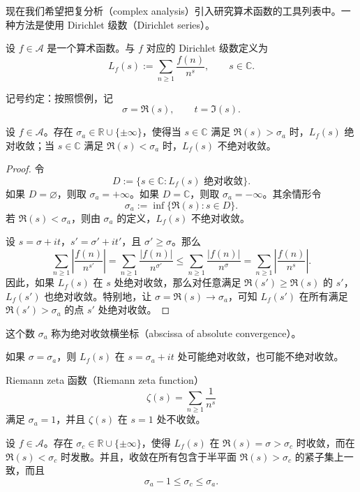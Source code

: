 现在我们希望把复分析（complex analysis）引入研究算术函数的工具列表中。一种方法是使用 Dirichlet 级数（Dirichlet series）。

\begin{definition}
	设 $f\in\mathcal A$ 是一个算术函数。与 $f$ 对应的 Dirichlet 级数定义为
	\[
		L_f(s):=\sum_{n\geq 1}\frac{f(n)}{n^s},
		\qquad s\in\mathbb C.
	\]
\end{definition}

记号约定：按照惯例，记
\[
	\sigma=\Re(s),\qquad t=\Im(s).
\]

\begin{theorem}[原文 Theorem 4.1]
	设 $f\in\mathcal A$。存在 $\sigma_a\in\mathbb R\cup\{\pm\infty\}$，使得当 $s\in\mathbb C$ 满足 $\Re(s)>\sigma_a$ 时，$L_f(s)$ 绝对收敛；当 $s\in\mathbb C$ 满足 $\Re(s)<\sigma_a$ 时，$L_f(s)$ 不绝对收敛。
\end{theorem}

\begin{proof}
	令
	\[
		D:=\{s\in\mathbb C:L_f(s)\text{ 绝对收敛}\}.
	\]
	如果 $D=\varnothing$，则取 $\sigma_a=+\infty$。如果 $D=\mathbb C$，则取 $\sigma_a=-\infty$。其余情形令
	\[
		\sigma_a:=\inf\{\Re(s):s\in D\}.
	\]
	若 $\Re(s)<\sigma_a$，则由 $\sigma_a$ 的定义，$L_f(s)$ 不绝对收敛。

	设 $s=\sigma+it$，$s'=\sigma'+it'$，且 $\sigma'\geq\sigma$。那么
	\[
		\sum_{n\geq 1}\left|\frac{f(n)}{n^{s'}}\right|
		=
		\sum_{n\geq 1}\frac{|f(n)|}{n^{\sigma'}}
		\leq
		\sum_{n\geq 1}\frac{|f(n)|}{n^\sigma}
		=
		\sum_{n\geq 1}\left|\frac{f(n)}{n^s}\right|.
	\]
	因此，如果 $L_f(s)$ 在 $s$ 处绝对收敛，那么对任意满足 $\Re(s')\geq\Re(s)$ 的 $s'$，$L_f(s')$ 也绝对收敛。特别地，让 $\sigma=\Re(s)\to\sigma_a$，可知 $L_f(s')$ 在所有满足 $\Re(s')>\sigma_a$ 的点 $s'$ 处绝对收敛。
\end{proof}

这个数 $\sigma_a$ 称为绝对收敛横坐标（abscissa of absolute convergence）。

\begin{remark}
	如果 $\sigma=\sigma_a$，则 $L_f(s)$ 在 $s=\sigma_a+it$ 处可能绝对收敛，也可能不绝对收敛。
\end{remark}

\begin{example}
	Riemann zeta 函数（Riemann zeta function）
	\[
		\zeta(s)=\sum_{n\geq 1}\frac1{n^s}
	\]
	满足 $\sigma_a=1$，并且 $\zeta(s)$ 在 $s=1$ 处不收敛。
\end{example}

\begin{theorem}[原文 Theorem 4.2]
	设 $f\in\mathcal A$。存在 $\sigma_c\in\mathbb R\cup\{\pm\infty\}$，使得 $L_f(s)$ 在 $\Re(s)=\sigma>\sigma_c$ 时收敛，而在 $\Re(s)<\sigma_c$ 时发散。并且，收敛在所有包含于半平面 $\Re(s)>\sigma_c$ 的紧子集上一致，而且
	\[
		\sigma_a-1\leq \sigma_c\leq \sigma_a.
	\]
\end{theorem}

